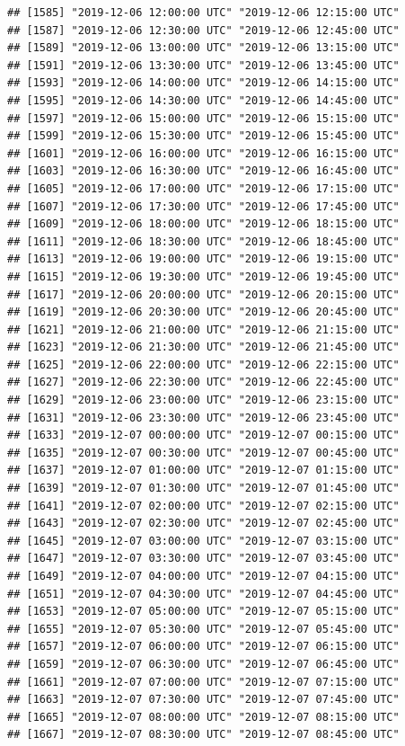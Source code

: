 \documentclass{article}\usepackage[]{graphicx}\usepackage[]{color}
\makeatletter
\newenvironment{kframe}{%
 \def\at@end@of@kframe{}%
 \ifinner\ifhmode%
  \def\at@end@of@kframe{\end{minipage}}%
  \begin{minipage}{\columnwidth}%
 \fi\fi%
 \def\FrameCommand##1{\hskip\@totalleftmargin \hskip-\fboxsep
 \colorbox{shadecolor}{##1}\hskip-\fboxsep
     \hskip-\linewidth \hskip-\@totalleftmargin \hskip\columnwidth}%
 \MakeFramed {\advance\hsize-\width
   \@totalleftmargin\z@ \linewidth\hsize
   \@setminipage}}%
 {\par\unskip\endMakeFramed%
 \at@end@of@kframe}
\newenvironment{knitrout}{}{} %
\makeatother
\begin{document}
\begin{knitrout}
\begin{kframe}
\begin{verbatim}
## [1585] "2019-12-06 12:00:00 UTC" "2019-12-06 12:15:00 UTC"
## [1587] "2019-12-06 12:30:00 UTC" "2019-12-06 12:45:00 UTC"
## [1589] "2019-12-06 13:00:00 UTC" "2019-12-06 13:15:00 UTC"
## [1591] "2019-12-06 13:30:00 UTC" "2019-12-06 13:45:00 UTC"
## [1593] "2019-12-06 14:00:00 UTC" "2019-12-06 14:15:00 UTC"
## [1595] "2019-12-06 14:30:00 UTC" "2019-12-06 14:45:00 UTC"
## [1597] "2019-12-06 15:00:00 UTC" "2019-12-06 15:15:00 UTC"
## [1599] "2019-12-06 15:30:00 UTC" "2019-12-06 15:45:00 UTC"
## [1601] "2019-12-06 16:00:00 UTC" "2019-12-06 16:15:00 UTC"
## [1603] "2019-12-06 16:30:00 UTC" "2019-12-06 16:45:00 UTC"
## [1605] "2019-12-06 17:00:00 UTC" "2019-12-06 17:15:00 UTC"
## [1607] "2019-12-06 17:30:00 UTC" "2019-12-06 17:45:00 UTC"
## [1609] "2019-12-06 18:00:00 UTC" "2019-12-06 18:15:00 UTC"
## [1611] "2019-12-06 18:30:00 UTC" "2019-12-06 18:45:00 UTC"
## [1613] "2019-12-06 19:00:00 UTC" "2019-12-06 19:15:00 UTC"
## [1615] "2019-12-06 19:30:00 UTC" "2019-12-06 19:45:00 UTC"
## [1617] "2019-12-06 20:00:00 UTC" "2019-12-06 20:15:00 UTC"
## [1619] "2019-12-06 20:30:00 UTC" "2019-12-06 20:45:00 UTC"
## [1621] "2019-12-06 21:00:00 UTC" "2019-12-06 21:15:00 UTC"
## [1623] "2019-12-06 21:30:00 UTC" "2019-12-06 21:45:00 UTC"
## [1625] "2019-12-06 22:00:00 UTC" "2019-12-06 22:15:00 UTC"
## [1627] "2019-12-06 22:30:00 UTC" "2019-12-06 22:45:00 UTC"
## [1629] "2019-12-06 23:00:00 UTC" "2019-12-06 23:15:00 UTC"
## [1631] "2019-12-06 23:30:00 UTC" "2019-12-06 23:45:00 UTC"
## [1633] "2019-12-07 00:00:00 UTC" "2019-12-07 00:15:00 UTC"
## [1635] "2019-12-07 00:30:00 UTC" "2019-12-07 00:45:00 UTC"
## [1637] "2019-12-07 01:00:00 UTC" "2019-12-07 01:15:00 UTC"
## [1639] "2019-12-07 01:30:00 UTC" "2019-12-07 01:45:00 UTC"
## [1641] "2019-12-07 02:00:00 UTC" "2019-12-07 02:15:00 UTC"
## [1643] "2019-12-07 02:30:00 UTC" "2019-12-07 02:45:00 UTC"
## [1645] "2019-12-07 03:00:00 UTC" "2019-12-07 03:15:00 UTC"
## [1647] "2019-12-07 03:30:00 UTC" "2019-12-07 03:45:00 UTC"
## [1649] "2019-12-07 04:00:00 UTC" "2019-12-07 04:15:00 UTC"
## [1651] "2019-12-07 04:30:00 UTC" "2019-12-07 04:45:00 UTC"
## [1653] "2019-12-07 05:00:00 UTC" "2019-12-07 05:15:00 UTC"
## [1655] "2019-12-07 05:30:00 UTC" "2019-12-07 05:45:00 UTC"
## [1657] "2019-12-07 06:00:00 UTC" "2019-12-07 06:15:00 UTC"
## [1659] "2019-12-07 06:30:00 UTC" "2019-12-07 06:45:00 UTC"
## [1661] "2019-12-07 07:00:00 UTC" "2019-12-07 07:15:00 UTC"
## [1663] "2019-12-07 07:30:00 UTC" "2019-12-07 07:45:00 UTC"
## [1665] "2019-12-07 08:00:00 UTC" "2019-12-07 08:15:00 UTC"
## [1667] "2019-12-07 08:30:00 UTC" "2019-12-07 08:45:00 UTC"

\end{verbatim}
\end{kframe}
\end{knitrout}
\end{document}
